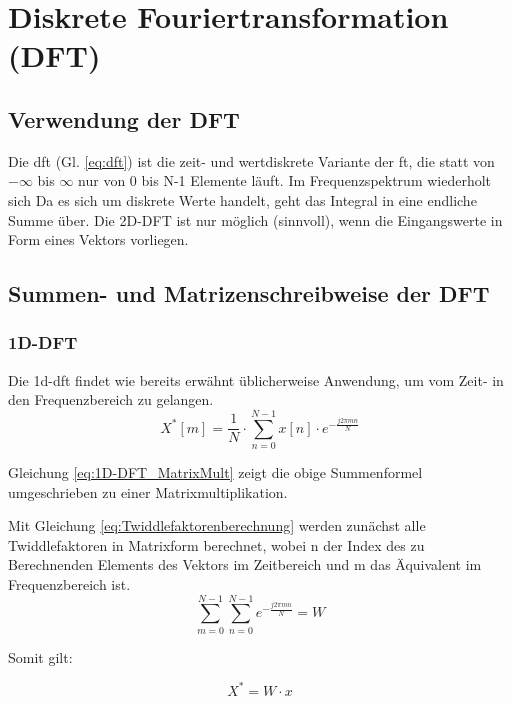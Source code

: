 \section{Diskrete Fouriertransformation (DFT)}

\subsection{Verwendung der DFT}

Die \gls{dft} (Gl. \ref{eq:dft}) ist die zeit- und wertdiskrete Variante der \gls{ft}, die statt von $-\infty$ bis $\infty$ nur von 0 bis N-1 Elemente läuft. 
Im Frequenzspektrum wiederholt sich 
Da es sich um diskrete Werte handelt, geht das Integral in eine endliche Summe über. Die 2D-DFT ist nur möglich (sinnvoll), wenn die Eingangswerte in Form eines Vektors vorliegen.


\subsection{Summen- und Matrizenschreibweise der DFT}
\subsubsection{1D-DFT}
Die \gls{1d-dft} findet wie bereits erwähnt üblicherweise Anwendung, um vom Zeit- in den Frequenzbereich zu gelangen.
\begin{equation}\label{eq:dft}
 X^* \left[ m \right] = \frac{1}{N} \cdot \sum^{N-1}_{n=0} x[n] \cdot e^{-\frac{j 2 \pi m n}{N}}
\end{equation}



Gleichung \ref{eq:1D-DFT_MatrixMult} zeigt die obige Summenformel umgeschrieben zu einer Matrixmultiplikation.

Mit Gleichung \ref{eq:Twiddlefaktorenberechnung} werden zunächst alle Twiddlefaktoren in Matrixform berechnet, wobei n der Index des zu Berechnenden Elements des Vektors im Zeitbereich und
m das Äquivalent im Frequenzbereich ist.
\begin{equation}\label{eq:Twiddlefaktorenberechnung}
\sum^{N-1 }_{m=0} \sum^{N-1 }_{n=0} e^{-\frac{j 2 \pi m n}{N}} = W
\end{equation}


Somit gilt:

\begin{equation}\label{eq:1D-DFT_MatrixMult}
X^* = W \cdot x
\end{equation}

